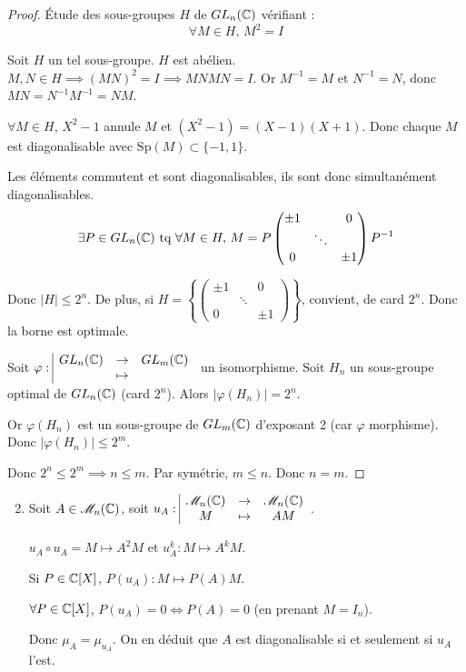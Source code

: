 \begin{proof}
    Étude des sous-groupes $H$ de $GL_n(\mathbb{C})$ vérifiant :
    \[ \forall M \in H, \, M^2 = I \]
    
    Soit $H$ un tel sous-groupe. $H$ est abélien.
    $M, N \in H \implies (MN)^2 = I \implies MNMN = I$.
    Or $M^{-1} = M$ et $N^{-1} = N$, donc $MN = N^{-1} M^{-1} = NM$.
    
    $\forall M \in H$, $X^2 - 1$ annule $M$ et $(X^2 - 1) = (X-1)(X+1)$.
    Donc chaque $M$ est diagonalisable avec $\text{Sp}(M) \subset \{-1, 1\}$.
    
    Les éléments commutent et sont diagonalisables, ils sont donc simultanément diagonalisables.
    \[ \exists P \in GL_n(\mathbb{C}) \text{ tq } \forall M \in H, \, M = P \begin{pmatrix} \pm 1 & & 0 \\ & \ddots & \\ 0 & & \pm 1 \end{pmatrix} P^{-1} \]
    
    Donc $|H| \leqslant 2^n$. De plus, si $H = \left\{ \begin{pmatrix} \pm 1 & & 0 \\ & \ddots & \\ 0 & & \pm 1 \end{pmatrix} \right\}$, convient, de card $2^n$.
    Donc la borne est optimale.
    
    Soit $\varphi: \space \begin{array}{|ccc} \displaystyle GL_n(\mathbb{C}) & \to & \displaystyle GL_m(\mathbb{C}) \\ \displaystyle  & \mapsto & \displaystyle  \end{array}$ un isomorphisme.
    Soit $H_n$ un sous-groupe optimal de $GL_n(\mathbb{C})$ (card $2^n$).
    Alors $|\varphi(H_n)| = 2^n$.
    
    Or $\varphi(H_n)$ est un sous-groupe de $GL_m(\mathbb{C})$ d'exposant 2 (car $\varphi$ morphisme).
    Donc $|\varphi(H_n)| \leqslant 2^m$.
    
    Donc $2^n \leqslant 2^m \implies n \leqslant m$.
    Par symétrie, $m \leqslant n$. Donc $n = m$.
\end{proof}

\begin{enumerate}
    \setcounter{enumi}{1}
    \item Soit $A \in \mathscr M_n(\mathbb{C})$, soit $u_A: \space \begin{array}{|ccc} \displaystyle \mathscr M_n(\mathbb{C}) & \to & \displaystyle \mathscr M_n(\mathbb{C}) \\ \displaystyle M & \mapsto & \displaystyle AM \end{array}$.
    
    $u_A \circ u_A = M \mapsto A^2 M$ et $u_A^k : M \mapsto A^k M$.
    
    Si $P \in \mathbb{C}[X]$, $P(u_A) : M \mapsto P(A)M$.
    
    $\forall P \in \mathbb{C}[X]$, $P(u_A) = 0 \iff P(A) = 0$ (en prenant $M=I_n$).
    
    Donc $\mu_A = \mu_{u_A}$.
    On en déduit que $A$ est diagonalisable si et seulement si $u_A$ l'est.
\end{enumerate}

